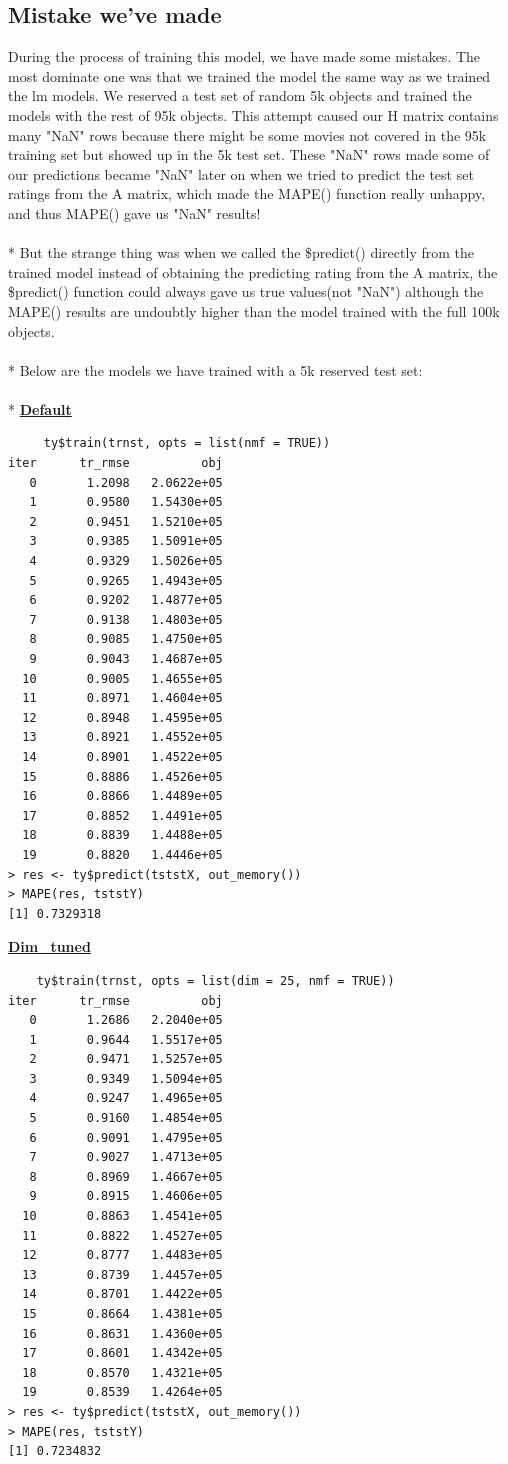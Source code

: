 \documentclass[11pt]{article}
\newcommand\tab[1][0.5cm]{\hspace*{#1}}
\begin{document}
\subsection{Mistake we've made}
\tab{}During the process of training this model, we have made some mistakes. The most dominate one was that we trained the model the same way as we trained the lm models. 
We reserved a test set of random 5k objects and trained the models with the rest of 95k objects. This attempt caused our H matrix contains many "NaN" rows because there might be some movies not covered in the 95k training set but showed up in the 5k test set. These "NaN" rows made some of our predictions became "NaN" later on when we tried to predict the test set ratings from the A matrix, which made the MAPE() function really unhappy, and thus MAPE() gave us "NaN" results!
\\\\*
\tab{}But the strange thing was when we called the \$predict() directly from the trained model instead of obtaining the predicting rating from the A matrix, the \$predict() function could always gave us true values(not "NaN") although the MAPE() results are undoubtly higher than the model trained with the full 100k objects.
\\\\*
\tab{}Below are the models we have trained with a 5k reserved test set:
\\\\*
\textbf{\underline{Default}}
\begin{verbatim}
     ty$train(trnst, opts = list(nmf = TRUE))
iter      tr_rmse          obj
   0       1.2098   2.0622e+05
   1       0.9580   1.5430e+05
   2       0.9451   1.5210e+05
   3       0.9385   1.5091e+05
   4       0.9329   1.5026e+05
   5       0.9265   1.4943e+05
   6       0.9202   1.4877e+05
   7       0.9138   1.4803e+05
   8       0.9085   1.4750e+05
   9       0.9043   1.4687e+05
  10       0.9005   1.4655e+05
  11       0.8971   1.4604e+05
  12       0.8948   1.4595e+05
  13       0.8921   1.4552e+05
  14       0.8901   1.4522e+05
  15       0.8886   1.4526e+05
  16       0.8866   1.4489e+05
  17       0.8852   1.4491e+05
  18       0.8839   1.4488e+05
  19       0.8820   1.4446e+05
> res <- ty$predict(tststX, out_memory())
> MAPE(res, tststY)
[1] 0.7329318
\end{verbatim}
\textbf{\underline{Dim\_tuned}}
\begin{verbatim}
    ty$train(trnst, opts = list(dim = 25, nmf = TRUE))
iter      tr_rmse          obj
   0       1.2686   2.2040e+05
   1       0.9644   1.5517e+05
   2       0.9471   1.5257e+05
   3       0.9349   1.5094e+05
   4       0.9247   1.4965e+05
   5       0.9160   1.4854e+05
   6       0.9091   1.4795e+05
   7       0.9027   1.4713e+05
   8       0.8969   1.4667e+05
   9       0.8915   1.4606e+05
  10       0.8863   1.4541e+05
  11       0.8822   1.4527e+05
  12       0.8777   1.4483e+05
  13       0.8739   1.4457e+05
  14       0.8701   1.4422e+05
  15       0.8664   1.4381e+05
  16       0.8631   1.4360e+05
  17       0.8601   1.4342e+05
  18       0.8570   1.4321e+05
  19       0.8539   1.4264e+05
> res <- ty$predict(tststX, out_memory())
> MAPE(res, tststY)
[1] 0.7234832
\end{verbatim}
\end{document}
